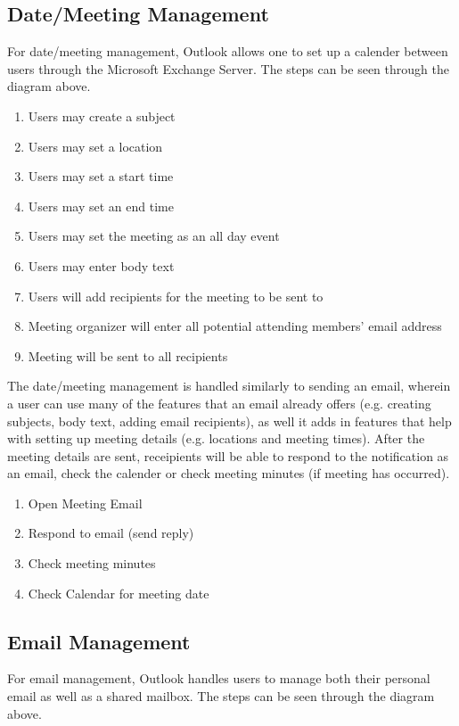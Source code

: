 \documentclass{sigchi}
\begin{document}
\subsection{Date/Meeting Management}

For date/meeting management, Outlook allows one to set up a calender between users through the Microsoft Exchange Server. The steps can be seen through the diagram above.
\begin{enumerate}
\item Users may create a subject
\item Users may set a location
\item Users may set a start time
\item Users may set an end time
\item Users may set the meeting as an all day event
\item Users may enter body text
\item Users will add recipients for the meeting to be sent to
\item Meeting organizer will enter all potential attending members' email address
\item Meeting will be sent to all recipients
\end{enumerate}

The date/meeting management is handled similarly to sending an email, wherein a user can use many of the features that an email already offers (e.g. creating subjects, body text, adding email recipients), as well it adds in features that help with setting up meeting details (e.g. locations and meeting times).
After the meeting details are sent, receipients will be able to respond to the notification as an email, check the calender or check meeting minutes (if meeting has occurred).

\begin{enumerate}
\item Open Meeting Email
\item Respond to email (send reply)
\item Check meeting minutes
\item Check Calendar for meeting date
\end{enumerate}

\subsection{Email Management}

For email management, Outlook handles users to manage both their personal email as well as a shared mailbox.  The steps can be seen through the diagram above.
\end{document}
